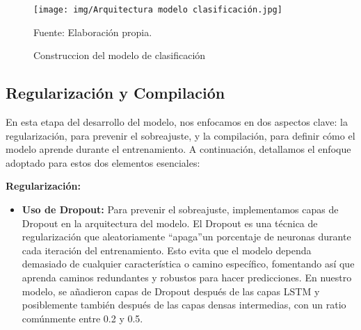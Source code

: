 \begin{figure}[H]
    \begin{minipage}[t]{0.9\textwidth}
        \caption{Construccion del modelo de clasificación}
        \label{parquitectura_clasificación}        
    \end{minipage}

    \vspace{10pt}

    \begin{minipage}[b]{1\textwidth}
        \centering
        \texttt{[image: img/Arquitectura modelo clasificación.jpg]}        
    \end{minipage}

    \begin{minipage}[t]{0.9\textwidth}
        Fuente: Elaboración propia.
    \end{minipage}
\end{figure}

\subsection{Regularización y Compilación}

En esta etapa del desarrollo del modelo, nos enfocamos en dos aspectos clave: la regularización, para prevenir el sobreajuste, y la compilación, para definir cómo el modelo aprende durante el entrenamiento. A continuación, detallamos el enfoque adoptado para estos dos elementos esenciales:

\textbf{Regularización:} 
\begin{itemize}
    \item \textbf{Uso de Dropout:} Para prevenir el sobreajuste, implementamos capas de Dropout en la arquitectura del modelo. El Dropout es una técnica de regularización que aleatoriamente \textquotedblleft apaga\textquotedblright un porcentaje de neuronas durante cada iteración del entrenamiento. Esto evita que el modelo dependa demasiado de cualquier característica o camino específico, fomentando así que aprenda caminos redundantes y robustos para hacer predicciones. En nuestro modelo, se añadieron capas de Dropout después de las capas LSTM y posiblemente también después de las capas densas intermedias, con un ratio comúnmente entre 0.2 y 0.5.
\end{itemize}

